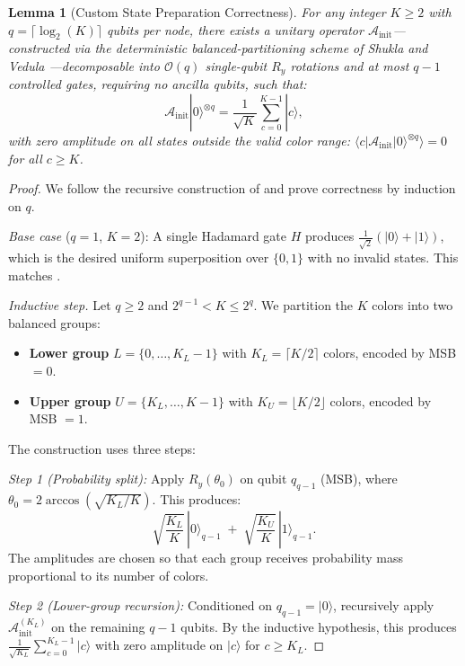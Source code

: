 \documentclass{ieeeaccess}
\newtheorem{lemma}[theorem]{Lemma}
\begin{document}
\begin{lemma}[Custom State Preparation Correctness]
\label{lem:state_prep}
For any integer $K \ge 2$ with $q = \lceil \log_2(K) \rceil$ qubits per node, there exists a unitary operator $\mathcal{A}_{\mathrm{init}}$---constructed via the deterministic balanced-partitioning scheme of Shukla and Vedula \cite{shukla2024}---decomposable into $\mathcal{O}(q)$ single-qubit $R_y$ rotations and at most $q - 1$ controlled gates, requiring no ancilla qubits, such that:
\[
\mathcal{A}_{\mathrm{init}} |0\rangle^{\otimes q} = \frac{1}{\sqrt{K}} \sum_{c=0}^{K-1} |c\rangle,
\]
with zero amplitude on all states outside the valid color range: $\langle c | \mathcal{A}_{\mathrm{init}} |0\rangle^{\otimes q} \rangle = 0$ for all $c \ge K$.
\end{lemma}

\begin{proof}
We follow the recursive construction of \cite{shukla2024} and prove correctness by induction on $q$.

\textit{Base case} ($q = 1$, $K = 2$): A single Hadamard gate $H$ produces $\frac{1}{\sqrt{2}}(|0\rangle + |1\rangle)$, which is the desired uniform superposition over $\{0, 1\}$ with no invalid states. This matches \cite[Theorem~1, Case~1]{shukla2024}.

\textit{Inductive step.} Let $q \ge 2$ and $2^{q-1} < K \le 2^q$. We partition the $K$ colors into two balanced groups:
\begin{itemize}
    \item \textbf{Lower group} $L = \{0, \dots, K_L - 1\}$ with $K_L = \lceil K/2 \rceil$ colors, encoded by MSB $= 0$.
    \item \textbf{Upper group} $U = \{K_L, \dots, K - 1\}$ with $K_U = \lfloor K/2 \rfloor$ colors, encoded by MSB $= 1$.
\end{itemize}

The construction uses three steps:

\textit{Step 1 (Probability split):} Apply $R_y(\theta_0)$ on qubit $q_{q-1}$ (MSB), where $\theta_0 = 2 \arccos\!\left(\sqrt{K_L / K}\right)$. This produces:
\[
\sqrt{\frac{K_L}{K}}\, |0\rangle_{q-1} \;+\; \sqrt{\frac{K_U}{K}}\, |1\rangle_{q-1}.
\]
The amplitudes are chosen so that each group receives probability mass proportional to its number of colors.

\textit{Step 2 (Lower-group recursion):} Conditioned on $q_{q-1} = |0\rangle$, recursively apply $\mathcal{A}_{\mathrm{init}}^{(K_L)}$ on the remaining $q{-}1$ qubits. By the inductive hypothesis, this produces $\frac{1}{\sqrt{K_L}} \sum_{c=0}^{K_L-1} |c\rangle$ with zero amplitude on $|c\rangle$ for $c \ge K_L$.


\end{proof}
\end{document}
